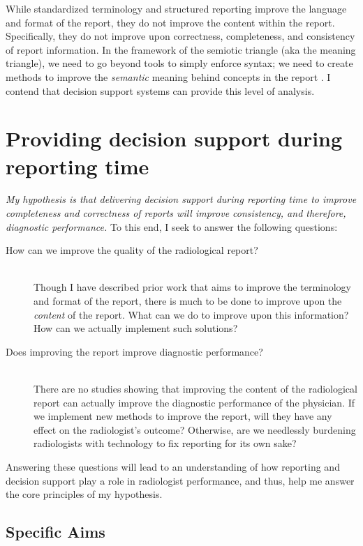 While standardized terminology and structured reporting improve the language and format of the report, they do not improve the content within the report.
Specifically, they do not improve upon correctness, completeness, and consistency of report information.
In the framework of the semiotic triangle (aka the meaning triangle), we need to go beyond tools to simply enforce syntax; we need to create methods to improve the \emph{semantic} meaning behind concepts in the report \cite{Mead:2006wm}.
I contend that decision support systems can provide this level of analysis. 


\section{Providing decision support during reporting time}

\emph{My hypothesis is that delivering decision support during reporting time to improve completeness and correctness of reports will improve consistency, and therefore, diagnostic performance.} To this end, I seek to answer the following questions:

\begin{description}
	\item[How can we improve the quality of the radiological report?] \hfill \\
	Though I have described prior work that aims to improve the terminology and format of the report, there is much to be done to improve upon the \emph{content} of the report. What can we do to improve upon this information? How can we actually implement such solutions?
	
	\item[Does improving the report improve diagnostic performance?] \hfill \\
	There are no studies showing that improving the content of the radiological report can actually improve the diagnostic performance of the physician. If we implement new methods to improve the report, will they have any effect on the radiologist's outcome? Otherwise, are we needlessly burdening radiologists with technology to fix reporting for its own sake?
\end{description}

Answering these questions will lead to an understanding of how reporting and decision support play a role in radiologist performance, and thus, help me answer the core principles of my hypothesis.

\subsection{Specific Aims}

